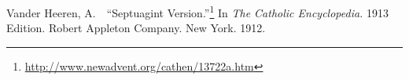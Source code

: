 \documentclass[twocolumn]{article}
\begin{document}
\begin{thebibliography}{}
\begin{small}
      Vander Heeren, A.\ \ ``Septuagint Version.''\footnote{%
         \url{http://www.newadvent.org/cathen/13722a.htm}%
      }
      In {\it The Catholic Encyclopedia.}  1913 Edition.  Robert Appleton
      Company.  New York.  1912.

   \end{small}

\end{thebibliography}


\end{document}
